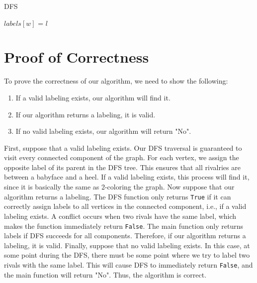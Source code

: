 \documentclass{article}
\begin{document}
\begin{algorithm}[H]
\caption{DFS}
\BlankLine
$labels[w]$ = $l$\;
\end{algorithm}

\section{Proof of Correctness}

To prove the correctness of our algorithm, we need to show the following:
\begin{enumerate}
    \item If a valid labeling exists, our algorithm will find it.
    \item If our algorithm returns a labeling, it is valid.
    \item If no valid labeling exists, our algorithm will return "No".
\end{enumerate}

First, suppose that a valid labeling exists.
Our DFS traversal is guaranteed to visit every connected component of the graph.
For each vertex, we assign the opposite label of its parent in the DFS tree.
This ensures that all rivalries are between a babyface and a heel.
If a valid labeling exists, this process will find it, since it is basically the same as 2-coloring the graph.
Now suppose that our algorithm returns a labeling.
The DFS function only returns \texttt{True} if it can correctly assign labels to all vertices in the connected component, i.e., if a valid labeling exists.
A conflict occurs when two rivals have the same label, which makes the function immediately return \texttt{False}.
The main function only returns labels if DFS succeeds for all components.
Therefore, if our algorithm returns a labeling, it is valid.
Finally, suppose that no valid labeling exists.
In this case, at some point during the DFS, there must be some point where we try to label two rivals with the same label.
This will cause DFS to immediately return \texttt{False}, and the main function will return "No".
Thus, the algorithm is correct.
\end{document}
